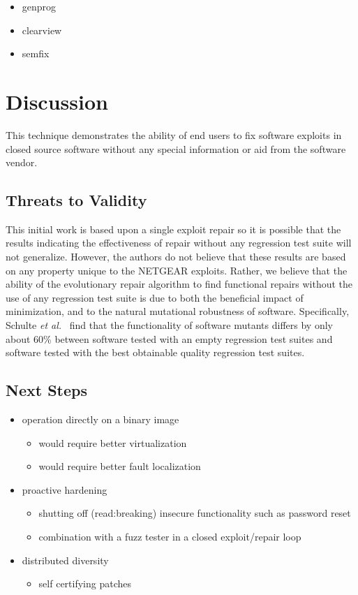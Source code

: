 \documentclass{sigcomm-alternate}
\begin{document}
\begin{itemize}
\item genprog
\item clearview
\item semfix
\end{itemize}

\section{Discussion}
\label{sec-6}
This technique demonstrates the ability of end users to fix software
exploits in closed source software without any special information or
aid from the software vendor.

\subsection{Threats to Validity}
\label{sec-6-1}
This initial work is based upon a single exploit repair so it is
possible that the results indicating the effectiveness of repair
without any regression test suite will not generalize.  However, the
authors do not believe that these results are based on any property
unique to the NETGEAR exploits. Rather, we believe that the ability of
the evolutionary repair algorithm to find functional repairs without
the use of any regression test suite is due to both the beneficial
impact of minimization, and to the natural mutational robustness of
software. Specifically, Schulte \emph{et al.}~\cite{schulte2013software} 
find that the functionality of software mutants differs by only about 60\%
between software tested with an empty regression test suites and software
tested with the best obtainable quality regression test suites.

\subsection{Next Steps}
\label{sec-6-2}

\begin{itemize}
\item operation directly on a binary image
\begin{itemize}
\item would require better virtualization
\item would require better fault localization
\end{itemize}
\item proactive hardening
\begin{itemize}
\item shutting off (read:breaking) insecure functionality such as
password reset
\item combination with a fuzz tester in a closed exploit/repair loop
\end{itemize}
\item distributed diversity
\begin{itemize}
\item self certifying patches
\end{itemize}
\end{itemize}
\end{document}
